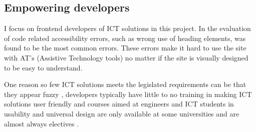 


\subsection{Empowering developers}
I focus on frontend developers of ICT solutions in this project. In the evaluation of \textcite{difi_digitale_2015} code related accessibility errors, such as wrong use of heading elements, was found to be the most common errors. These errors make it hard to use the site with AT's (Assistive Technology tools) no matter if the site is visually designed to be easy to understand.

One reason so few ICT solutions meets the legislated requirements can be that they appear fuzzy \parencite{begnum_universal_2017}, developers typically have little to no training in making ICT solutions user friendly \parencite{Law:ProgrammerFocusedWebsiteAccessibilityEvaluations:2005} and courses aimed at engineers and ICT students in usability and universal design are only available at some universities and are almost always electives \parencite{Jordan2010}.

